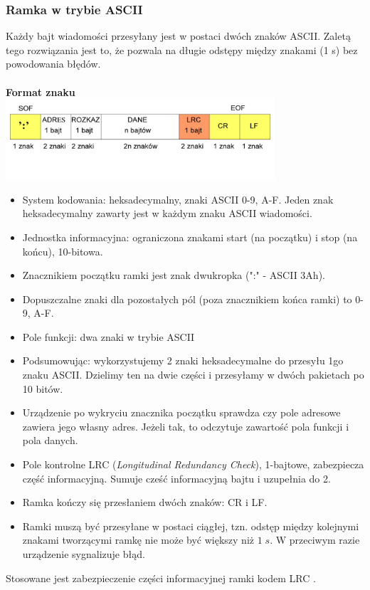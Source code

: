 		\subsubsection{Ramka w trybie ASCII}
			Każdy bajt wiadomości przesyłany jest w postaci dwóch znaków ASCII. Zaletą tego rozwiązania jest to, że pozwala na długie odstępy między znakami (1 s) bez powodowania błędów.\\\\\textbf{Format znaku}\\
			\includegraphics[width=10cm]{./wyklady/RS232_18_1.pdf}
			\begin{itemize}
				\item System kodowania: heksadecymalny, znaki ASCII 0-9, A-F. Jeden znak heksadecymalny zawarty jest w każdym znaku ASCII wiadomości.
				\item Jednostka informacyjna: ograniczona znakami start (na początku) i stop (na końcu), 10-bitowa.
				\item Znacznikiem początku ramki jest znak dwukropka (":" - ASCII 3Ah).
				\item Dopuszczalne znaki dla pozostałych pól (poza znacznikiem końca ramki) to 0-9, A-F.
				\item Pole funkcji: dwa znaki w trybie ASCII
				\item Podsumowując: wykorzystujemy 2 znaki heksadecymalne do przesyłu 1go znaku ASCII. Dzielimy ten na dwie części i przesyłamy w dwóch pakietach po 10 bitów.
				\item Urządzenie po wykryciu znacznika początku sprawdza czy pole adresowe zawiera jego własny adres. Jeżeli tak, to odczytuje zawartość pola funkcji i pola danych.
				\item Pole kontrolne LRC (\emph{Longitudinal Redundancy Check}), 1-bajtowe, zabezpiecza część informacyjną. Sumuje cześć informacyjną bajtu i uzupełnia do 2.
				\item Ramka kończy się przesłaniem dwóch znaków: CR i LF.
				\item Ramki muszą być przesyłane w postaci ciągłej, tzn. odstęp między kolejnymi znakami tworzącymi ramkę nie może być większy niż $1\;s$. W przeciwym razie urządzenie sygnalizuje błąd.
			\end{itemize}
			Stosowane jest zabezpieczenie części informacyjnej ramki kodem LRC .
